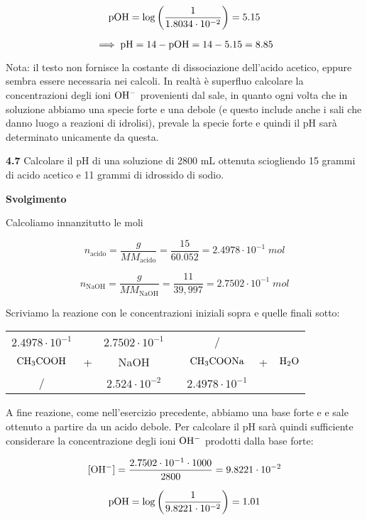 $$\rm pOH=\log{\left(\frac{1}{1.8034 \cdot 10^{-2}}\right)}=5.15$$

$$\implies \rm pH=14-pOH=14-5.15=8.85$$

Nota: il testo non fornisce la costante di dissociazione dell'acido acetico, eppure sembra essere necessaria nei calcoli. In realtà è superfluo calcolare la concentrazioni degli ioni $\rm OH^-$ provenienti dal sale, in quanto ogni volta che in soluzione abbiamo una specie forte e una debole (e questo include anche i sali che danno luogo a reazioni di idrolisi), prevale la specie forte e quindi il pH sarà determinato unicamente da questa.

\vspace{0.2cm}\textbf{4.7} Calcolare il pH di una soluzione di 2800 mL ottenuta sciogliendo 15 grammi di acido acetico e 11 grammi di idrossido di sodio.

\vspace{0.2cm}\large\textbf{Svolgimento}\normalsize

\vspace{0.2cm}Calcoliamo innanzitutto le moli

$$n_{\text{acido}}=\frac{g}{MM_{\text{acido}}}=\frac{15}{60.052}=2.4978 \cdot 10^{-1}\;mol$$

$$n_{\text{NaOH}}=\frac{g}{MM_{\text{NaOH}}}=\frac{11}{39,997}=2.7502 \cdot 10^{-1}\;mol$$

Scriviamo la reazione con le concentrazioni iniziali sopra e quelle finali sotto:

\begin{center}
    \begin{tabular}{ccccccc}
        $2.4978 \cdot 10^{-1}$ &  & $2.7502 \cdot 10^{-1}$ & & / &&\\
        $\rm CH_3COOH$ & + & NaOH & \ce{->} & $\rm CH_3COONa$ & + & $\rm H_2O$\\
        / &  &  $2.524 \cdot 10^{-2}$ & & $2.4978 \cdot 10^{-1}$&&\\
    \end{tabular}
\end{center}

A fine reazione, come nell'esercizio precedente, abbiamo una base forte e e sale ottenuto a partire da un acido debole. Per calcolare il pH sarà quindi sufficiente considerare la concentrazione degli ioni $\rm OH^-$ prodotti dalla base forte:

$$[\rm OH^-]=\frac{2.7502 \cdot 10^{-1} \cdot 1000}{2800}=9.8221 \cdot 10^{-2}$$

$$\rm pOH=\log{\left(\frac{1}{9.8221 \cdot 10^{-2}}\right)}=1.01$$

